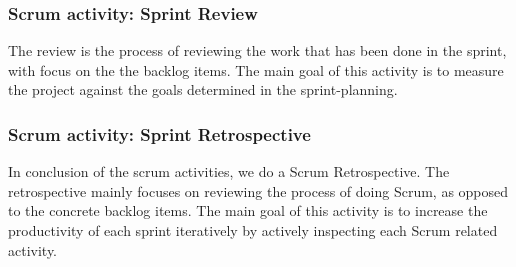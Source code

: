 \subsubsection{Scrum activity: Sprint Review}
The review is the process of reviewing the work that has been done in the sprint, with focus on the the backlog items. The main goal of this activity is to measure the project against the goals determined in the sprint-planning.
\subsubsection{Scrum activity: Sprint Retrospective}
In conclusion of the scrum activities, we do a Scrum Retrospective. The retrospective mainly focuses on reviewing the process of doing Scrum, as opposed to the concrete backlog items. The main goal of this activity is to increase the productivity of each sprint iteratively by actively inspecting each Scrum related activity.